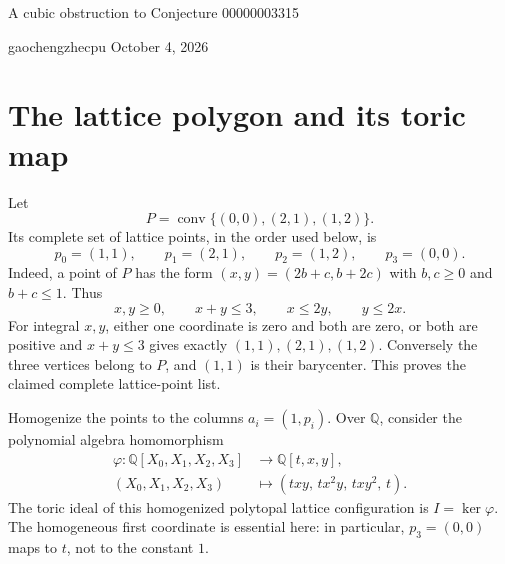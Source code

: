 \documentclass[11pt]{article}
\begin{document}
\begin{center}
{\Large A cubic obstruction to Conjecture 00000003315\par}
\vspace{8pt}
gaochengzhecpu \qquad October 4, 2026
\end{center}
\begin{abstract}
The toric ideal of the full lattice-point configuration of the triangle
$\operatorname{conv}\{(0,0),(2,1),(1,2)\}$ contains the nonzero cubic
$X_1X_2X_3-X_0^3$, but contains no nonzero binomial of degree at most two.
It therefore cannot be generated by quadratic circuit relations, as
asserted in Conjecture 00000003315. The accompanying Lean project proves
this for an actual polynomial algebra map, its kernel ideal, and every
putative set of quadratic binomial generators.
\end{abstract}

\section{The lattice polygon and its toric map}
Let
\[
 P=\operatorname{conv}\{(0,0),(2,1),(1,2)\}.
\]
Its complete set of lattice points, in the order used below, is
\[
 p_0=(1,1),\qquad p_1=(2,1),\qquad p_2=(1,2),\qquad p_3=(0,0).
\]
Indeed, a point of $P$ has the form $(x,y)=(2b+c,b+2c)$ with
$b,c\geq0$ and $b+c\leq1$. Thus
\[
 x,y\geq0,\qquad x+y\leq3,\qquad x\leq2y,\qquad y\leq2x.
\]
For integral $x,y$, either one coordinate is zero and both are zero,
or both are positive and $x+y\leq3$ gives exactly $(1,1),(2,1),(1,2)$.
Conversely the three vertices belong to $P$, and $(1,1)$ is their
barycenter. This proves the claimed complete lattice-point list.

Homogenize the points to the columns $a_i=(1,p_i)$. Over $\mathbb Q$,
consider the polynomial algebra homomorphism
\[
\begin{aligned}
 \varphi:\mathbb Q[X_0,X_1,X_2,X_3]&\longrightarrow\mathbb Q[t,x,y],\\
 (X_0,X_1,X_2,X_3)&\longmapsto(txy,\,tx^2y,\,txy^2,\,t).
\end{aligned}
\]
The toric ideal of this homogenized polytopal lattice configuration is
$I=\ker\varphi$. The homogeneous first coordinate is essential here:
in particular, $p_3=(0,0)$ maps to $t$, not to the constant $1$.
\end{document}
